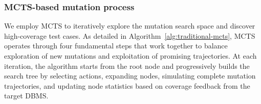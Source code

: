 




\subsubsection{MCTS-based mutation process} We employ MCTS to iteratively explore the mutation search space and discover high-coverage test cases. As detailed in Algorithm~\ref{alg:traditional-mcts}, MCTS operates through four fundamental steps that work together to balance exploration of new mutations and exploitation of promising trajectories. At each iteration, the algorithm starts from the root node and progressively builds the search tree by selecting actions, expanding nodes, simulating complete mutation trajectories, and updating node statistics based on coverage feedback from the target DBMS.

